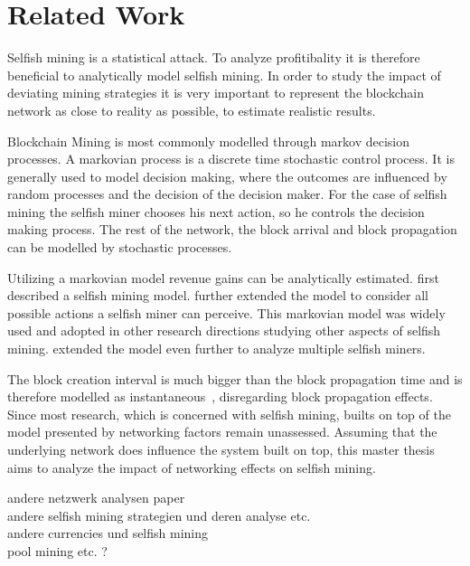 \chapter{Related Work}\label{chap:relatedwork}

Selfish mining is a statistical attack. To analyze profitibality it is therefore beneficial to analytically model selfish mining. In order to study the impact of deviating mining strategies it is very important to represent the blockchain network as close to reality as possible, to estimate realistic results.

Blockchain Mining is most commonly modelled through markov decision processes.
A markovian process is a discrete time stochastic control process. It is generally used to model decision making, where the outcomes are influenced by random processes and the decision of the decision maker.
For the case of selfish mining the selfish miner chooses his next action, so he controls the decision making process. The rest of the network, the block arrival and block propagation can be modelled by stochastic processes. 

Utilizing a markovian model revenue gains can be analytically estimated. \citeauthor{eyal} first described a selfish mining model. \citeauthor{optimal_sm} further extended the model to consider all possible actions a selfish miner can perceive. This markovian model was widely used and adopted in other research directions studying other aspects of selfish mining. \citeauthor{deepDiveSM} extended the model even further to analyze multiple selfish miners. 

The block creation interval is much bigger than the block propagation time and is therefore modelled as instantaneous~\cite{optimal_sm}, disregarding block propagation effects. Since most research, which is concerned with selfish mining, builts on top of the model presented by \citeauthor{optimal_sm} networking factors remain unassessed. Assuming that the underlying network does influence the system built on top, this master thesis aims to analyze the impact of networking effects on selfish mining.















andere netzwerk analysen paper\\
andere selfish mining strategien und deren analyse etc.\\
andere currencies und selfish mining\\ 
pool mining etc. ?\\